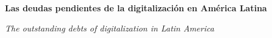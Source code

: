 
\renewcommand{\articuloidiomaxml}{es}
\renewcommand{\articulotitulo}{Las deudas pendientes de la digitalización en América Latina}
\renewcommand{\articuloautores}{Maria Mora}
\renewcommand{\articulodoi}{10.31637/epsir-2023-898}
\renewcommand{\articulotipo}{EDITORIAL}
\renewcommand{\articulorevista}{Revista Latinoamericana de Estudios Editoriales y Cultura Escrita}
\renewcommand{\articuloissne}{2591-3905}
\renewcommand{\articulovolumen}{01}
\renewcommand{\articulonumero}{01}
\renewcommand{\articulofecha}{ 2026}
\renewcommand{\articulopagina}{1}

\setcounter{page}{1}
\thispagestyle{firstpage}

\noindent\begin{minipage}[t]{\dimexpr\textwidth+\marginparsep+\marginparwidth\relax}%
{\sffamily\bfseries\Large\articulotitulo\par}%
\end{minipage}\par
\vspace{3mm}%
\renewcommand{\articulotitulotrans}{The outstanding debts of digitalization in Latin America}
\noindent\begin{minipage}[t]{\dimexpr\textwidth+\marginparsep+\marginparwidth\relax}%
{\sffamily\itshape\normalsize\articulotitulotrans\par}%
\end{minipage}\par
\vspace{4mm}%

